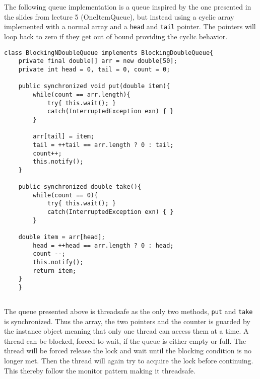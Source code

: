 \documentclass{ituhandin}
\begin{document}
\chapter{} %
\section{}

The following queue implementation is a queue inspired by the one presented in the slides from lecture 5 (OneItemQueue), but instead using a cyclic array implemented with a normal array and a \texttt{head} and \texttt{tail} pointer. The pointers will loop back to zero if they get out of bound providing the cyclic behavior.

\begin{lstlisting}[caption= Implementation of the \texttt{BlockingNDoubleQueue} blocking fixed size queue]
class BlockingNDoubleQueue implements BlockingDoubleQueue{
    private final double[] arr = new double[50];
    private int head = 0, tail = 0, count = 0;

    public synchronized void put(double item){
        while(count == arr.length){
            try{ this.wait(); }
            catch(InterruptedException exn) { }
        }

        arr[tail] = item;
        tail = ++tail == arr.length ? 0 : tail;
        count++;
        this.notify();
    }

    public synchronized double take(){
        while(count == 0){
            try{ this.wait(); }
            catch(InterruptedException exn) { }
        }

    double item = arr[head];
        head = ++head == arr.length ? 0 : head;
        count --;
        this.notify();
        return item;
    }
    }
\end{lstlisting}

\section{}
The queue presented above is threadsafe as the only two methods, \texttt{put} and \texttt{take} is synchronized. Thus  the array, the two pointers and the counter is guarded by the instance object meaning that only one thread can access them at a time. A thread can be blocked, forced to wait, if the queue is either empty or full. The thread will be forced release the lock and wait until the blocking condition is no longer met. Then the thread will again try to acquire the lock before continuing. This thereby follow the monitor pattern making it threadsafe. 
\end{document}
